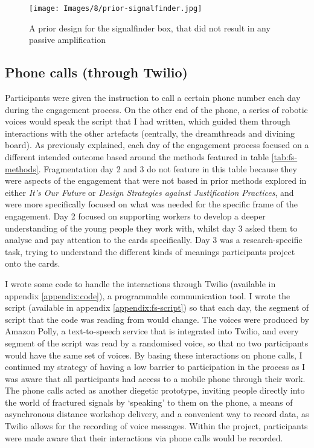 \begin{figure}
    \centering
    \texttt{[image: Images/8/prior-signalfinder.jpg]}
    \caption{A prior design for the signalfinder box, that did not result in any passive amplification}
    \label{fig:prior-box}
\end{figure}


\subsection{Phone calls (through Twilio)}

Participants were given the instruction to call a certain phone number each day during the engagement process. On the other end of the phone, a series of robotic voices would speak the script that I had written, which guided them through interactions with the other artefacts (centrally, the dreamthreads and divining board). As previously explained, each day of the engagement process focused on a different intended outcome based around the methods featured in table \ref{tab:fs-methods}. Fragmentation day 2 and 3 do not feature in this table because they were aspects of the engagement that were not based in prior methods explored in either \textit{It's Our Future} or \textit{Design Strategies against Justification Practices}, and were more specifically focused on what was needed for the specific frame of the engagement. Day 2 focused on supporting workers to develop a deeper understanding of the young people they work with, whilst day 3 asked them to analyse and pay attention to the cards specifically. Day 3 was a research-specific task, trying to understand the different kinds of meanings participants project onto the cards.  

I wrote some code to handle the interactions through Twilio (available in appendix \ref{appendix:code}), a programmable communication tool. I wrote the script (available in appendix \ref{appendix:fs-script}) so that each day, the segment of script that the code was reading from would change. The voices were produced by Amazon Polly, a text-to-speech service that is integrated into Twilio, and every segment of the script was read by a randomised voice, so that no two participants would have the same set of voices. By basing these interactions on phone calls, I continued my strategy of having a low barrier to participation in the process as I was aware that all participants had access to a mobile phone through their work. The phone calls acted as another diegetic prototype, inviting people directly into the world of fractured signals by `speaking' to them on the phone, a means of asynchronous distance workshop delivery, and a convenient way to record data, as Twilio allows for the recording of voice messages. Within the project, participants were made aware that their interactions via phone calls would be recorded.

